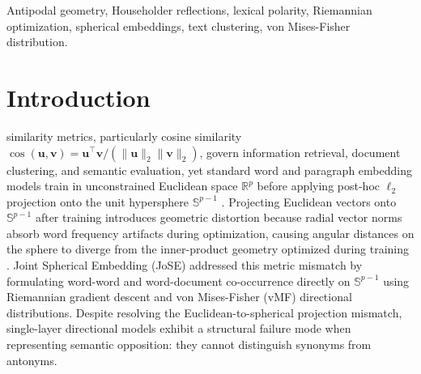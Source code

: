 \documentclass[journal]{IEEEtran}
\begin{document}
\begin{IEEEkeywords}
Antipodal geometry, Householder reflections, lexical polarity, Riemannian optimization, spherical embeddings, text clustering, von Mises-Fisher distribution.
\end{IEEEkeywords}

\section{Introduction}
 similarity metrics, particularly cosine similarity $\cos(\mathbf{u}, \mathbf{v}) = \mathbf{u}^\top \mathbf{v} / (\|\mathbf{u}\|_2 \|\mathbf{v}\|_2)$, govern information retrieval, document clustering, and semantic evaluation, yet standard word and paragraph embedding models train in unconstrained Euclidean space $\mathbb{R}^p$ before applying post-hoc $\ell_2$ projection onto the unit hypersphere $\mathbb{S}^{p-1}$ \cite{mikolov2013distributed,pennington2014glove,meng2019spherical}. Projecting Euclidean vectors onto $\mathbb{S}^{p-1}$ after training introduces geometric distortion because radial vector norms absorb word frequency artifacts during optimization, causing angular distances on the sphere to diverge from the inner-product geometry optimized during training \cite{meng2019spherical,banerjee2005clustering}. Joint Spherical Embedding (JoSE) \cite{meng2019spherical} addressed this metric mismatch by formulating word-word and word-document co-occurrence directly on $\mathbb{S}^{p-1}$ using Riemannian gradient descent and von Mises-Fisher (vMF) directional distributions. Despite resolving the Euclidean-to-spherical projection mismatch, single-layer directional models exhibit a structural failure mode when representing semantic opposition: they cannot distinguish synonyms from antonyms.
\end{document}
